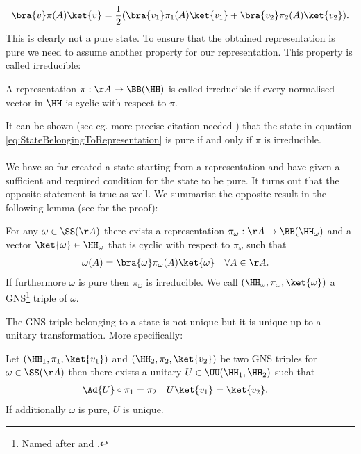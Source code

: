 \begin{equation}
	\bra{v}\pi(A)\ket{v}=\frac{1}{2}(\bra{v_1}\pi_1(A)\ket{v_1}+\bra{v_2}\pi_2(A)\ket{v_2}).
\end{equation}
This is clearly not a pure state. To ensure that the obtained representation is pure we need to assume another property for our representation. This property is called irreducible:
\begin{definition}
	A representation $\pi:\AA\rightarrow \BB(\HH)$ is called irreducible if every normalised vector in $\HH$ is cyclic with respect to $\pi$.
\end{definition}
It can be shown (see eg. {\color{red}more precise citation needed} \cite{bratteli1979operator}) that the state in equation \eqref{eq:StateBelongingToRepresentation} is pure if and only if $\pi$ is irreducible.\\\\
We have so far created a state starting from a representation and have given a sufficient and required condition for the state to be pure. It turns out that the opposite statement is true as well. We summarise the opposite result in the following lemma (see \cite{bratteli1979operator} for the proof):
\begin{lemma}
	For any $\omega\in\SS(\AA)$ there exists a representation $\pi_\omega:\AA\rightarrow\BB(\HH_\omega)$ and a vector $\ket{\omega}\in\HH_\omega$ that is cyclic with respect to $\pi_\omega$ such that
	\begin{align}
		\omega(A)&=\bra{\omega}\pi_\omega(A)\ket{\omega}&\forall A&\in\AA.
	\end{align}
	If furthermore $\omega$ is pure then $\pi_\omega$ is irreducible. We call $(\HH_\omega,\pi_\omega,\ket{\omega})$ a GNS\footnote{Named after \cite{gelfand1943imbedding} and \cite{segal1947irreducible}.} triple of $\omega$.
\end{lemma}
The GNS triple belonging to a state is not unique but it is unique up to a unitary transformation. More specifically:
\begin{lemma}\label{lem:UniquenessOfGNSTriple}
	Let $(\HH_1,\pi_1,\ket{v_1})$ and $(\HH_2,\pi_2,\ket{v_2})$ be two GNS triples for $\omega\in\SS(\AA)$ then there exists a unitary $U\in\UU(\HH_1,\HH_2)$ such that
	\begin{align}
		\Ad{U}\circ\pi_1&=\pi_2&U\ket{v_1}&=\ket{v_2}.
	\end{align}
	If additionally $\omega$ is pure, $U$ is unique.
\end{lemma}

